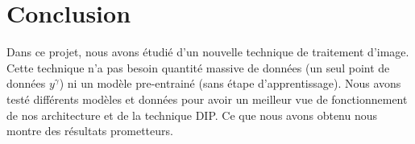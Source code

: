 \documentclass[
  11pt,
  dvipsnames]{article}
\begin{document}
\hypertarget{conclusion}{%
\section{Conclusion}\label{conclusion}}

Dans ce projet, nous avons étudié d'un nouvelle technique de traitement d'image.
Cette technique n'a pas besoin quantité massive de données (un seul point de données \(y^\gamma\))
ni un modèle pre-entrainé (sans étape d'apprentissage). Nous avons testé différents modèles et données
pour avoir un meilleur vue de fonctionnement de nos architecture et de la technique DIP.
Ce que nous avons obtenu nous montre des résultats prometteurs.
\newpage

\printbibliography
\end{document}

